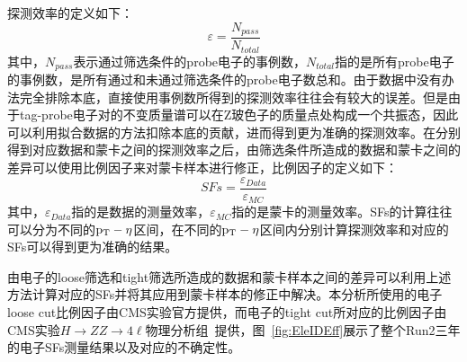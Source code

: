 探测效率的定义如下：
\begin{equation}
    \varepsilon = \frac{N_{pass}}{N_{total}}
\end{equation}
其中，$N_{pass}$表示通过筛选条件的probe电子的事例数，$N_{total}$指的是所有probe电子的事例数，是所有通过和未通过筛选条件的probe电子数总和。由于数据中没有办法完全排除本底，直接使用事例数所得到的探测效率往往会有较大的误差。但是由于tag-probe电子对的不变质量谱可以在Z玻色子的质量点处构成一个共振态，因此可以利用拟合数据的方法扣除本底的贡献，进而得到更为准确的探测效率。在分别得到对应数据和蒙卡之间的探测效率之后，由筛选条件所造成的数据和蒙卡之间的差异可以使用比例因子来对蒙卡样本进行修正，比例因子的定义如下：
\begin{equation}
    SFs = \frac{\varepsilon_{Data}}{\varepsilon_{MC}}
\end{equation}
其中，$\varepsilon_{Data}$指的是数据的测量效率，$\varepsilon_{MC}$指的是蒙卡的测量效率。SFs的计算往往可以分为不同的$\mathrm{p_{T}}-\eta$区间，在不同的$\mathrm{p_{T}}-\eta$区间内分别计算探测效率和对应的SFs可以得到更为准确的结果。

由电子的loose筛选和tight筛选所造成的数据和蒙卡样本之间的差异可以利用上述方法计算对应的SFs并将其应用到蒙卡样本的修正中解决。本分析所使用的电子loose cut比例因子由CMS实验官方提供，而电子的tight cut所对应的比例因子由CMS实验$H\rightarrow ZZ\rightarrow 4\ell$物理分析组~\cite{cmsHZZ}提供，图~\ref{fig:EleIDEff}展示了整个Run2三年的电子SFs测量结果以及对应的不确定性。

